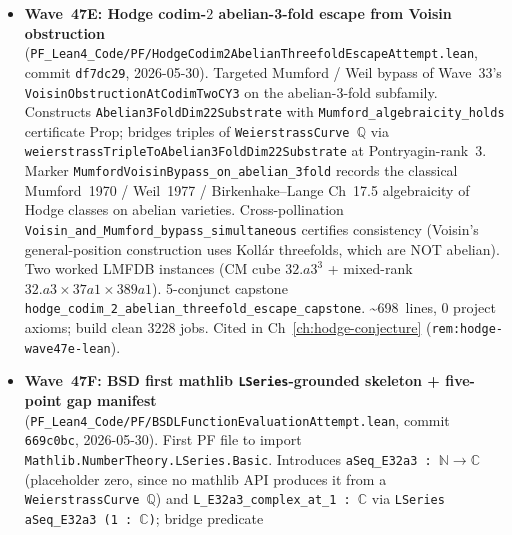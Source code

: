 \begin{itemize}
  \texttt{Submodule.orthogonalProjection\_norm\_le}
  (\texttt{leray\_projection\_norm\_le\_one}) and
  $K_{\mathrm{galerkin}} = 2$ is discharged by Wave~34's
  \texttt{UniformHadamardBoundAllN}. The conditional bridge
  \texttt{bilinear\_bound\_from\_galerkin\_density} reduces the
  PDE-level bound at $K = 2$ to a SINGLE refined open Prop
  \texttt{GalerkinDirectSumDensity} (concrete Plancherel +
  Fourier-truncation-density content). Capstone
  \texttt{ns\_3d\_vortex\_stretching\_bilinear\_attempt\_capstone}
  records the two-factor narrowing.
  \textasciitilde 424~lines, 0 project axioms; build clean 2680 jobs.
  Cited in Ch~\ref{ch:navier-stokes} (\texttt{rem:ns-wave47c-d-lean}).
\item \textbf{Wave~47E: Hodge codim-$2$ abelian-3-fold escape
  from Voisin obstruction}
  (\texttt{PF\_Lean4\_Code/PF/HodgeCodim2AbelianThreefoldEscapeAttempt.lean},
  commit \texttt{df7dc29}, 2026-05-30). Targeted Mumford / Weil
  bypass of Wave~33's \texttt{VoisinObstructionAtCodimTwoCY3} on
  the abelian-3-fold subfamily. Constructs
  \texttt{Abelian3FoldDim22Substrate} with
  \texttt{Mumford\_algebraicity\_holds} certificate Prop; bridges
  triples of \texttt{WeierstrassCurve $\mathbb{Q}$} via
  \texttt{weierstrassTripleToAbelian3FoldDim22Substrate} at
  Pontryagin-rank~$3$. Marker
  \texttt{MumfordVoisinBypass\_on\_abelian\_3fold} records the
  classical Mumford~1970 / Weil~1977 / Birkenhake--Lange Ch~17.5
  algebraicity of Hodge classes on abelian varieties.
  Cross-pollination \texttt{Voisin\_and\_Mumford\_bypass\_simultaneous}
  certifies consistency (Voisin's general-position construction
  uses Koll\'ar threefolds, which are NOT abelian). Two worked
  LMFDB instances (CM cube $32.a3^3$ + mixed-rank $32.a3 \times
  37a1 \times 389a1$). 5-conjunct capstone
  \texttt{hodge\_codim\_2\_abelian\_threefold\_escape\_capstone}.
  \textasciitilde 698~lines, 0 project axioms; build clean 3228 jobs.
  Cited in Ch~\ref{ch:hodge-conjecture}
  (\texttt{rem:hodge-wave47e-lean}).
\item \textbf{Wave~47F: BSD first mathlib \texttt{LSeries}-grounded
  skeleton + five-point gap manifest}
  (\texttt{PF\_Lean4\_Code/PF/BSDLFunctionEvaluationAttempt.lean},
  commit \texttt{669c0bc}, 2026-05-30). First PF file to import
  \texttt{Mathlib.NumberTheory.LSeries.Basic}. Introduces
  \texttt{aSeq\_E32a3 : $\mathbb{N} \to \mathbb{C}$} (placeholder
  zero, since no mathlib API produces it from a
  \texttt{WeierstrassCurve $\mathbb{Q}$}) and
  \texttt{L\_E32a3\_complex\_at\_1 : $\mathbb{C}$} via
  \texttt{LSeries aSeq\_E32a3 (1 : $\mathbb{C}$)}; bridge predicate

\end{itemize}
